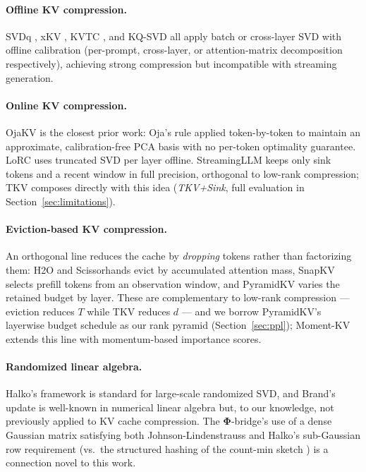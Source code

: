 \documentclass{article}
\let\PhiSymbol\Phi
\renewcommand{\Phi}{\boldsymbol{\PhiSymbol}}
\begin{document}
\paragraph{Offline KV compression.}
SVDq \citep{svdq2025}, xKV \citep{xkv2025}, KVTC \citep{kvtc2026}, and
KQ-SVD \citep{kqsvd2025} all apply batch or cross-layer SVD with offline
calibration (per-prompt, cross-layer, or attention-matrix decomposition
respectively), achieving strong compression but incompatible with streaming
generation.

\paragraph{Online KV compression.}
OjaKV \citep{ojakov2025} is the closest prior work: Oja's rule applied
token-by-token to maintain an approximate, calibration-free PCA basis with
no per-token optimality guarantee.  LoRC \citep{lorc2024} uses truncated
SVD per layer offline.  StreamingLLM \citep{streamingllm2023} keeps only
sink tokens and a recent window in full precision, orthogonal to low-rank
compression; TKV composes directly with this idea (\emph{TKV+Sink}, full
evaluation in Section~\ref{sec:limitations}).

\paragraph{Eviction-based KV compression.}
An orthogonal line reduces the cache by \emph{dropping} tokens rather than
factorizing them: H2O \citep{h2o2023} and Scissorhands \citep{scissorhands2023}
evict by accumulated attention mass, SnapKV \citep{snapkv2024} selects
prefill tokens from an observation window, and PyramidKV \citep{pyramidkv2024}
varies the retained budget by layer.  These are complementary to low-rank
compression --- eviction reduces $T$ while TKV reduces $d$ --- and we borrow
PyramidKV's layerwise budget schedule as our rank pyramid
(Section~\ref{sec:ppl}); Moment-KV \citep{momentkv2024} extends this line
with momentum-based importance scores.

\paragraph{Randomized linear algebra.}
Halko's framework \citep{halko2011} is standard for large-scale randomized
SVD, and Brand's update \citep{brand2006} is well-known in numerical linear
algebra but, to our knowledge, not previously applied to KV cache
compression.  The $\Phi$-bridge's use of a dense Gaussian matrix
satisfying both Johnson-Lindenstrauss and Halko's sub-Gaussian row
requirement (vs.\ the structured hashing of the count-min sketch
\citep{cormode2005}) is a connection novel to this work.
\end{document}
